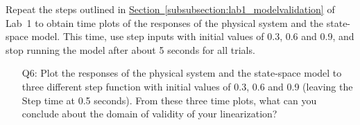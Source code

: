 \documentclass[12pt]{report}
\newcommand\drew[1]{\textcolor{red}{#1}}
\begin{document}
Repeat the steps outlined in \hyperref[subsubsection:lab1_modelvalidation]{Section~\ref{subsubsection:lab1_modelvalidation}} of Lab~1 to obtain time plots of the responses of the physical system and the state-space model. This time, use step inputs with initial values of 0.3, 0.6 and 0.9, and stop running the model after about 5 seconds for all trials.
\begin{enumerate}[Question]
    \item[Q6:] Plot the responses of the physical system and the state-space model to three different step function with initial values of 0.3, 0.6 and 0.9 (leaving the Step time at 0.5 seconds). From these three time plots, what can you conclude about the domain of validity of your linearization?\\
\end{enumerate}
\end{document}
